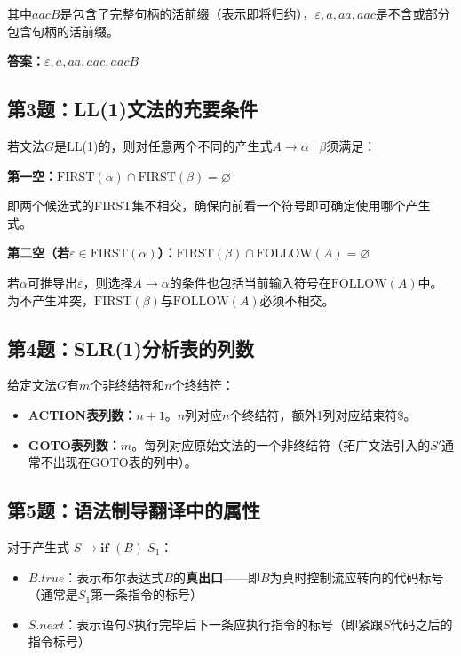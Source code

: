\documentclass[12pt,a4paper,fontset=fandol]{ctexart}
\begin{document}
其中$aacB$是包含了完整句柄的活前缀（表示即将归约），$\varepsilon, a, aa, aac$是不含或部分包含句柄的活前缀。

\textbf{答案：$\varepsilon, a, aa, aac, aacB$}

\subsection*{第3题：LL(1)文法的充要条件}
若文法$G$是LL(1)的，则对任意两个不同的产生式$A \to \alpha \mid \beta$须满足：

\textbf{第一空：}$\text{FIRST}(\alpha) \cap \text{FIRST}(\beta) = \varnothing$

即两个候选式的FIRST集不相交，确保向前看一个符号即可确定使用哪个产生式。

\textbf{第二空（若$\varepsilon \in \text{FIRST}(\alpha)$）：}$\text{FIRST}(\beta) \cap \text{FOLLOW}(A) = \varnothing$

若$\alpha$可推导出$\varepsilon$，则选择$A \to \alpha$的条件也包括当前输入符号在$\text{FOLLOW}(A)$中。为不产生冲突，$\text{FIRST}(\beta)$与$\text{FOLLOW}(A)$必须不相交。

\subsection*{第4题：SLR(1)分析表的列数}
给定文法$G$有$m$个非终结符和$n$个终结符：

\begin{itemize}
    \item \textbf{ACTION表列数：$n + 1$}。$n$列对应$n$个终结符，额外1列对应结束符$\$$。
    \item \textbf{GOTO表列数：$m$}。每列对应原始文法的一个非终结符（拓广文法引入的$S'$通常不出现在GOTO表的列中）。
\end{itemize}

\subsection*{第5题：语法制导翻译中的属性}
对于产生式 $S \to \textbf{if } (B) \; S_1$：

\begin{itemize}
    \item \textbf{$B.\textit{true}$}：表示布尔表达式$B$的\textbf{真出口}——即$B$为真时控制流应转向的代码标号（通常是$S_1$第一条指令的标号）
    \item \textbf{$S.\textit{next}$}：表示语句$S$执行完毕后下一条应执行指令的标号（即紧跟$S$代码之后的指令标号）
\end{itemize}
\end{document}

